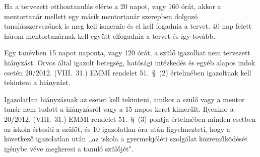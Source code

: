 Ha a tervezett otthontanulás elérte a 20 napot, vagy 160 órát, akkor a mentortanár mellett egy másik mentortanár szerepben dolgozó tanulásszervezőnek is meg kell ismernie és el kell fogadnia a tervet. 40 nap felett három mentortanárnak kell együtt elfogadnia a tervet és így tovább.

Egy tanévben 15 napot naponta, vagy 120 órát, a szülő igazolhat nem tervezett hiányzást. Orvos által igazolt betegség, hatósági intézkedés és egyéb alapos indok esetén 20/2012. (VIII.~31.) EMMI rendelet 51.~§~(2) értelmében igazoltnak kell tekinteni a hiányzást.

Igazolatlan hiányzásnak az esetet kell tekinteni, amikor a szülő vagy a mentor tanár nem tudott a hiányzásról vagy a 15 napos keret kimerült. Ilyenkor a 20/2012. (VIII.~31.) EMMI rendelet 51.~§~(3) pontja értelmében minden esetben az iskola értesíti a szülőt, és 10 igazolatlan óra után figyelmezteti, hogy a következő igazolatlan után ,,az iskola a gyermekjóléti szolgálat közreműködését igénybe véve megkeresi a tanuló szülőjét".
